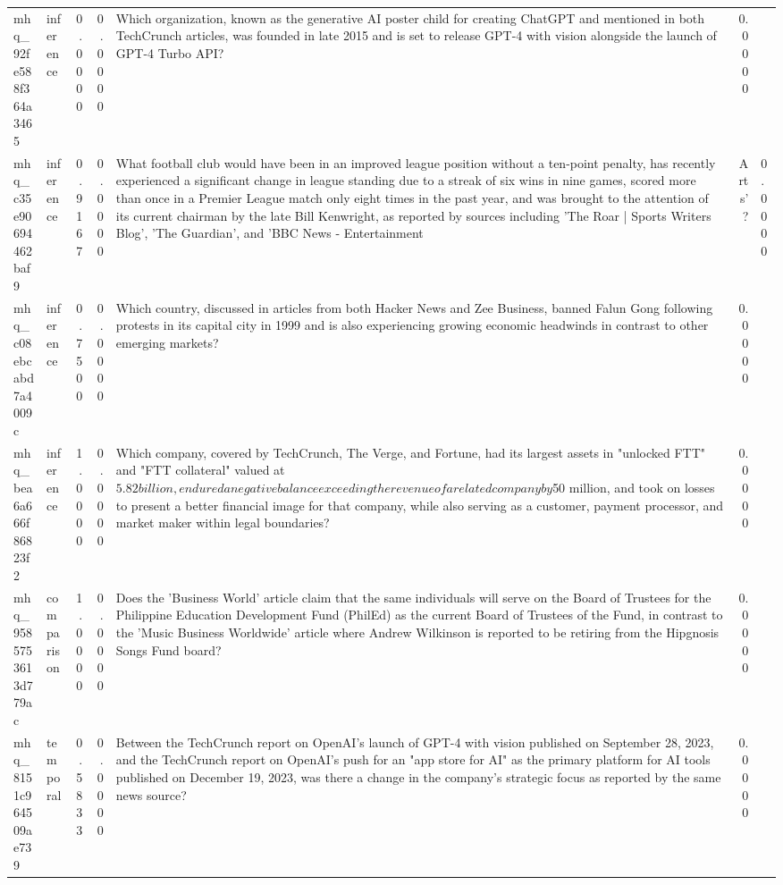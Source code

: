 \begin{tabular}{llrrlr}
mhq_92fe588f364a3465 & inference & 0.0000 & 0.0000 & Which organization, known as the generative AI poster child for creating ChatGPT and mentioned in both TechCrunch articles, was founded in late 2015 and is set to release GPT-4 with vision alongside the launch of GPT-4 Turbo API? & 0.0000 \\
mhq_c35e90694462baf9 & inference & 0.9167 & 0.0000 & What football club would have been in an improved league position without a ten-point penalty, has recently experienced a significant change in league standing due to a streak of six wins in nine games, scored more than once in a Premier League match only eight times in the past year, and was brought to the attention of its current chairman by the late Bill Kenwright, as reported by sources including 'The Roar | Sports Writers Blog', 'The Guardian', and 'BBC News - Entertainment & Arts'? & 0.0000 \\
mhq_c08ebcabd7a4009c & inference & 0.7500 & 0.0000 & Which country, discussed in articles from both Hacker News and Zee Business, banned Falun Gong following protests in its capital city in 1999 and is also experiencing growing economic headwinds in contrast to other emerging markets? & 0.0000 \\
mhq_bea6a666f86823f2 & inference & 1.0000 & 0.0000 & Which company, covered by TechCrunch, The Verge, and Fortune, had its largest assets in "unlocked FTT" and "FTT collateral" valued at $5.82 billion, endured a negative balance exceeding the revenue of a related company by $50 million, and took on losses to present a better financial image for that company, while also serving as a customer, payment processor, and market maker within legal boundaries? & 0.0000 \\
mhq_9585753613d779ac & comparison & 1.0000 & 0.0000 & Does the 'Business World' article claim that the same individuals will serve on the Board of Trustees for the Philippine Education Development Fund (PhilEd) as the current Board of Trustees of the Fund, in contrast to the 'Music Business Worldwide' article where Andrew Wilkinson is reported to be retiring from the Hipgnosis Songs Fund board? & 0.0000 \\
mhq_8151c964509ae739 & temporal & 0.5833 & 0.0000 & Between the TechCrunch report on OpenAI's launch of GPT-4 with vision published on September 28, 2023, and the TechCrunch report on OpenAI's push for an "app store for AI" as the primary platform for AI tools published on December 19, 2023, was there a change in the company's strategic focus as reported by the same news source? & 0.0000 \\

\end{tabular}
